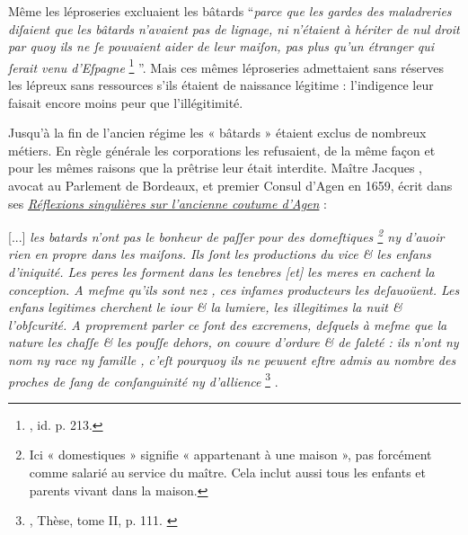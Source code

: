  Même les léproseries excluaient les bâtards \enquote{\emph{parce que les gardes des maladreries diſaient que les bâtards n'avaient pas de lignage, ni n'étaient à hériter de nul droit par quoy ils ne ſe pouvaient aider de leur maiſon, pas plus qu'un étranger qui ſerait venu d'Eſpagne}%
\footnote{, id. p. 213.}%
}. Mais ces mêmes léproseries admettaient sans réserves les lépreux sans ressources s'ils étaient de naissance légitime : l'indigence leur faisait encore moins peur que l'illégitimité.

 Jusqu'à la fin de l'ancien régime les « bâtards » étaient exclus de nombreux métiers. En règle générale les corporations les refusaient, de la même façon et pour les mêmes raisons que la prêtrise leur était interdite. Maître Jacques , avocat au Parlement de Bordeaux, et premier Consul d'Agen en 1659, écrit dans ses \href{http://www.babordnum.fr/files/original/859d36685f2d7b2f871c648ea08bd103.pdf}{\emph{Réflexions singulières sur l'ancienne coutume d'Agen}}  :
%
\begin{displayquote}

{[...] \emph{les batards n'ont pas le bonheur de paſſer pour des domeſtiques%
\footnote{Ici « domestiques » signifie « appartenant à une maison », pas forcément comme salarié au service du maître. Cela inclut aussi tous les enfants et parents vivant dans la maison.} 
ny d'auoir rien en propre dans les maiſons. Ils ſont les productions du vice \& les enfans d'iniquité. Les peres les forment dans les tenebres \emph{[et]} les meres en cachent la conception. A meſme qu'ils sont nez , ces infames producteurs les deſauoüent. Les enfans legitimes cherchent le iour \& la lumiere, les illegitimes la nuit \& l'obſcurité. A proprement parler ce ſont des excremens, deſquels à meſme que la nature les chaſſe \& les pouſſe dehors, on couure d'ordure \& de ſaleté : ils n'ont ny nom ny race ny famille , c'eſt pourquoy ils ne peuuent eſtre admis au nombre des proches de ſang de conſanguinité ny d'allience}}%
\footnote{, Thèse, tome II, p. 111.%
\label{notecapul111}}%
.

\end{displayquote}


